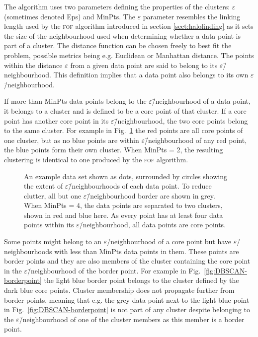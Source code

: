\documentclass[english, twoside]{HYgradu}
\begin{document}
The algorithm uses two parameters defining the properties of the clusters: $\varepsilon$ (sometimes denoted Eps) and MinPts. The $\varepsilon$ parameter resembles the linking length used by the \textsc{fof} algorithm introduced in section \ref{sect:halofinding} as it sets the size of the neighbourhood used when determining whether a data point is part of a cluster. The distance function can be chosen freely to best fit the problem, possible metrics being e.g. Euclidean or Manhattan distance. The points within the distance $\varepsilon$ from a given data point are said to belong to its $\varepsilon$\=/neighbourhood. This definition implies that a data point also belongs to its own $\varepsilon$\=/neighbourhood.

If more than MinPts data points belong to the $\varepsilon$\=/neighbourhood of a data point, it belongs to a cluster and is defined to be a core point of that cluster. If a core point has another core point in its $\varepsilon$\=/neighbourhood, the two core points belong to the same cluster. For example in Fig.\ \ref{fig:DBSCAN-twocores} the red points are all core points of one cluster, but as no blue points are within $\varepsilon$\=/neighbourhood of any red point, the blue points form their own cluster. When MinPts = 2, the resulting clustering is identical to one produced by the \textsc{fof} algorithm.

\begin{figure}
    \centering
    
    \caption{An example data set shown as dots, surrounded by circles showing the extent of $\varepsilon$\=/neighbourhoods of each data point. To reduce clutter, all but one $\varepsilon$\=/neighbourhood border are shown in grey. When MinPts = 4, the data points are separated to two clusters, shown in red and blue here. As every point has at least four data points within its $\varepsilon$\=/neighbourhood, all data points are core points.}\label{fig:DBSCAN-twocores}
\end{figure}

Some points might belong to an $\varepsilon$\=/neighbourhood of a core point but have $\varepsilon$\=/neighbourhoods with less than MinPts data points in them. These points are border points and they are also members of the cluster containing the core point in the $\varepsilon$\=/neighbourhood of the border point. For example in Fig.\ \ref{fig:DBSCAN-borderpoint} the light blue border point belongs to the cluster defined by the dark blue core points. Cluster membership does not propagate further from border points, meaning that e.g. the grey data point next to the light blue point in Fig.\ \ref{fig:DBSCAN-borderpoint} is not part of any cluster despite belonging to the $\varepsilon$\=/neighbourhood of one of the cluster members as this member is a border point.
\end{document}

